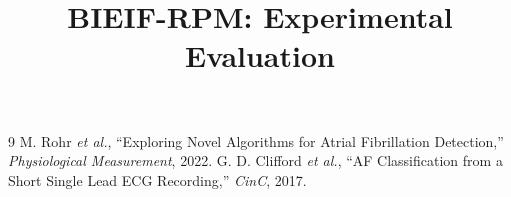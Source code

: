 \documentclass[10pt,twocolumn]{article}
\title{\textbf{BIEIF-RPM: Experimental Evaluation}}
\author{}
\date{}
\begin{document}
\maketitle

\begin{thebibliography}{9}
\footnotesize
{} M. Rohr \textit{et al.}, ``Exploring Novel Algorithms for Atrial Fibrillation Detection,'' \textit{Physiological Measurement}, 2022.
 G. D. Clifford \textit{et al.}, ``AF Classification from a Short Single Lead ECG Recording,'' \textit{CinC}, 2017.
\end{thebibliography}
\end{document}
